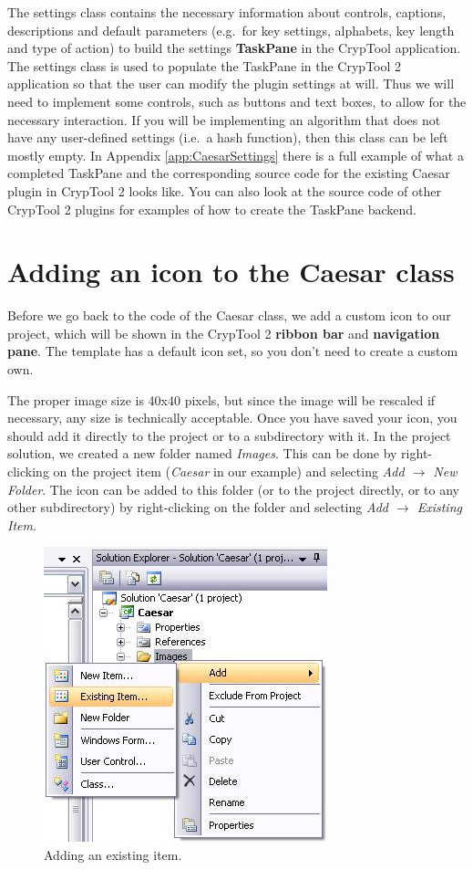 The settings class contains the necessary information about controls, captions, descriptions and default parameters (e.g.\ for key settings, alphabets, key length and type of action) to build the settings \textbf{TaskPane} in the CrypTool application. The settings class is used to populate the TaskPane in the CrypTool 2 application so that the user can modify the plugin settings at will. Thus we will need to implement some controls, such as buttons and text boxes, to allow for the necessary interaction. If you will be implementing an algorithm that does not have any user-defined settings (i.e.\ a hash function), then this class can be left mostly empty. In Appendix \ref{app:CaesarSettings} there is a full example of what a completed TaskPane and the corresponding source code for the existing Caesar plugin in CrypTool 2 looks like. You can also look at the source code of other CrypTool 2 plugins for examples of how to create the TaskPane backend.

\section{Adding an icon to the Caesar class}
\label{sec:AddingAnIconToTheCaesarClass}

Before we go back to the code of the Caesar class, we add a custom icon to our project, which will be shown in the CrypTool 2 \textbf{ribbon bar} and \textbf{navigation pane}. The template has a default icon set, so you don't need to create a custom own.

The proper image size is 40x40 pixels, but since the image will be rescaled if necessary, any size is technically acceptable. Once you have saved your icon, you should add it directly to the project or to a subdirectory with it. In the project solution, we created a new folder named \textit{Images}. This can be done by right-clicking on the project item (\textit{Caesar} in our example) and selecting \textit{Add $\rightarrow$ New Folder}. The icon can be added to this folder (or to the project directly, or to any other subdirectory) by right-clicking on the folder and selecting \textit{Add $\rightarrow$ Existing Item}.

\begin{figure}[h!]
	\centering
		\includegraphics{figures/add_existing_item.jpg}
	\caption{Adding an existing item.}
	\label{fig:add_existing_item}
\end{figure}
\clearpage

